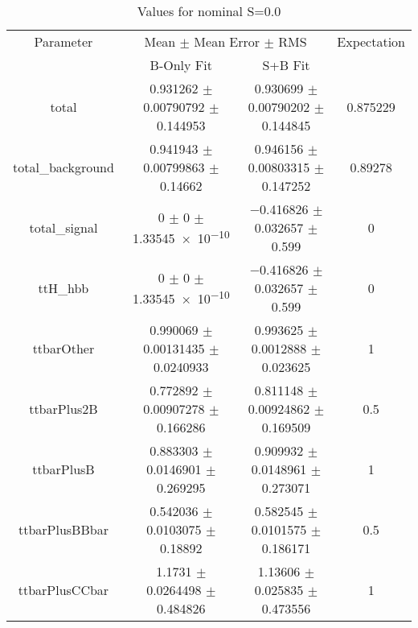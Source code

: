 \begin{table}
\centering
\caption{Values for nominal S=0.0}
\begin{tabular}{cccc}
\toprule
Parameter & \multicolumn{2}{c}{Mean $\pm$ Mean Error $\pm$ RMS} & Expectation\\
 & B-Only Fit & S+B Fit & \\
\midrule
total & \num{0.931262} $\pm$ \num{0.00790792} $\pm$ \num{0.144953} & \num{0.930699} $\pm$ \num{0.00790202} $\pm$ \num{0.144845} & \num{0.875229}\\
total\_background & \num{0.941943} $\pm$ \num{0.00799863} $\pm$ \num{0.14662} & \num{0.946156} $\pm$ \num{0.00803315} $\pm$ \num{0.147252} & \num{0.89278}\\
total\_signal & \num{0} $\pm$ \num{0} $\pm$ \num{1.33545e-10} & \num{-0.416826} $\pm$ \num{0.032657} $\pm$ \num{0.599} & \num{0}\\
ttH\_hbb & \num{0} $\pm$ \num{0} $\pm$ \num{1.33545e-10} & \num{-0.416826} $\pm$ \num{0.032657} $\pm$ \num{0.599} & \num{0}\\
ttbarOther & \num{0.990069} $\pm$ \num{0.00131435} $\pm$ \num{0.0240933} & \num{0.993625} $\pm$ \num{0.0012888} $\pm$ \num{0.023625} & \num{1}\\
ttbarPlus2B & \num{0.772892} $\pm$ \num{0.00907278} $\pm$ \num{0.166286} & \num{0.811148} $\pm$ \num{0.00924862} $\pm$ \num{0.169509} & \num{0.5}\\
ttbarPlusB & \num{0.883303} $\pm$ \num{0.0146901} $\pm$ \num{0.269295} & \num{0.909932} $\pm$ \num{0.0148961} $\pm$ \num{0.273071} & \num{1}\\
ttbarPlusBBbar & \num{0.542036} $\pm$ \num{0.0103075} $\pm$ \num{0.18892} & \num{0.582545} $\pm$ \num{0.0101575} $\pm$ \num{0.186171} & \num{0.5}\\
ttbarPlusCCbar & \num{1.1731} $\pm$ \num{0.0264498} $\pm$ \num{0.484826} & \num{1.13606} $\pm$ \num{0.025835} $\pm$ \num{0.473556} & \num{1}\\
\bottomrule
\end{tabular}
\end{table}